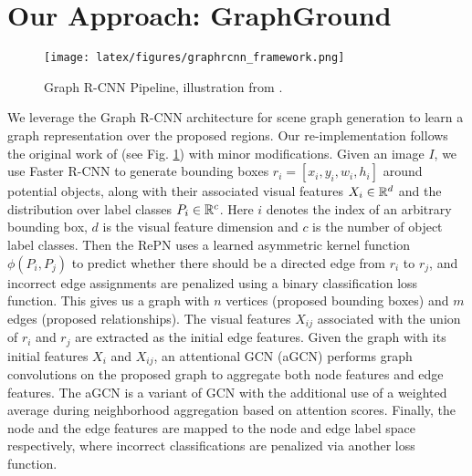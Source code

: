 
\section{Our Approach: GraphGround}
\begin{figure}
    \centering
    \texttt{[image: latex/figures/graphrcnn\_framework.png]}
    \caption{Graph R-CNN Pipeline, illustration from \cite{yang2018graph}.}
    \label{fig:graphrcnn_framework}
\end{figure}

We leverage the Graph R-CNN architecture for scene graph generation to learn a graph representation over the proposed regions. Our re-implementation follows the original work of \cite{yang2018graph} (see Fig. \ref{fig:graphrcnn_framework}) with minor modifications. Given an image $I$, we use Faster R-CNN \cite{ren2015faster} to generate bounding boxes $r_i = [x_i, y_i, w_i, h_i]$  around potential objects, along with their associated visual features $X_i \in \mathbb{R}^d$ and the distribution over label classes $P_i \in \mathbb{R}^c$. Here $i$ denotes the index of an arbitrary bounding box, $d$ is the visual feature dimension and $c$ is the number of object label classes. Then the RePN uses a learned asymmetric kernel function $\phi(P_i, P_j)$ to predict whether there should be a directed edge from $r_i$ to $r_j$, and incorrect edge assignments are penalized using a binary classification loss function. This gives us a graph with $n$ vertices (proposed bounding boxes) and $m$ edges (proposed relationships). The visual features $X_{ij}$ associated with the union of $r_i$ and $r_j$ are extracted as the initial edge features. Given the graph with its initial features $X_i$ and $X_{ij}$, an attentional GCN (aGCN) performs graph convolutions on the proposed graph to aggregate both node features and edge features.  The aGCN is a variant of GCN \cite{kipf2016semi} with the additional use of a weighted average during neighborhood aggregation based on attention scores. Finally, the node and the edge features are mapped to the node and edge label space respectively, where incorrect classifications are penalized via another loss function. 

